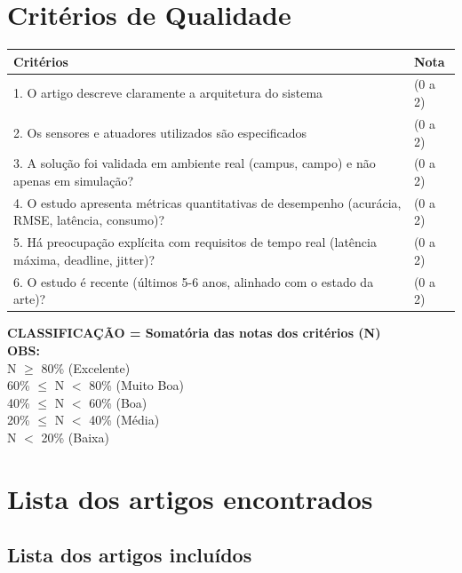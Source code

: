 \documentclass[12pt,a4paper]{article}
\begin{document}
\vspace{0.5cm}
\section*{Critérios de Qualidade}

\begin{table}[ht]
\centering
\begin{tabular}{|p{10cm}|p{4cm}|}
\hline
\textbf{Critérios} & \textbf{Nota} \\
\hline
1. O artigo descreve claramente a arquitetura do sistema& (0 a 2) \\
\hline
2. Os sensores e atuadores utilizados são especificados & (0 a 2) \\
\hline
3. A solução foi validada em ambiente real (campus, campo) e não apenas em simulação? & (0 a 2) \\
\hline
4. O estudo apresenta métricas quantitativas de desempenho (acurácia, RMSE, latência, consumo)? & (0 a 2) \\
\hline
5. Há preocupação explícita com requisitos de tempo real (latência máxima, deadline, jitter)? & (0 a 2) \\
\hline
6. O estudo é recente (últimos 5-6 anos, alinhado com o estado da arte)? & (0 a 2) \\
\hline
\hline
\end{tabular}
\end{table}

\noindent \textbf{CLASSIFICAÇÃO = Somatória das notas dos critérios (N)} \\
\textbf{OBS:} \\
N $\geq$ 80\% (Excelente) \\
60\% $\le$ N $<$ 80\% (Muito Boa) \\
40\% $\le$ N $<$ 60\% (Boa) \\
20\% $\le$ N $<$ 40\% (Média) \\
N $<$ 20\% (Baixa)

\section*{Lista dos artigos encontrados}
\subsection*{Lista dos artigos incluídos}
\end{document}
